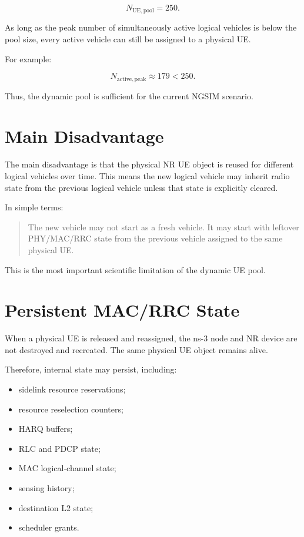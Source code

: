 \documentclass[11pt]{article}
\begin{document}
\[
N_{\mathrm{UE,pool}} = 250.
\]

As long as the peak number of simultaneously active logical vehicles is below the pool size, every active vehicle can still be assigned to a physical UE.

For example:

\[
N_{\mathrm{active,peak}} \approx 179 < 250.
\]

Thus, the dynamic pool is sufficient for the current NGSIM scenario.

\section{Main Disadvantage}

The main disadvantage is that the physical NR UE object is reused for different logical vehicles over time. This means the new logical vehicle may inherit radio state from the previous logical vehicle unless that state is explicitly cleared.

In simple terms:

\begin{quote}
The new vehicle may not start as a fresh vehicle. It may start with leftover PHY/MAC/RRC state from the previous vehicle assigned to the same physical UE.
\end{quote}

This is the most important scientific limitation of the dynamic UE pool.

\section{Persistent MAC/RRC State}

When a physical UE is released and reassigned, the ns-3 node and NR device are not destroyed and recreated. The same physical UE object remains alive.

Therefore, internal state may persist, including:

\begin{itemize}
    \item sidelink resource reservations;
    \item resource reselection counters;
    \item HARQ buffers;
    \item RLC and PDCP state;
    \item MAC logical-channel state;
    \item sensing history;
    \item destination L2 state;
    \item scheduler grants.
\end{itemize}
\end{document}
